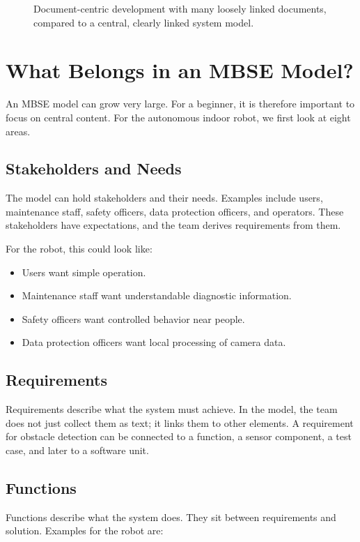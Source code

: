 \begin{figure}[H]
  \centering
  \caption{Document-centric development with many loosely linked documents, compared to a central, clearly linked system model.}
  \label{fig:kap02-dokumentenzentriert-vs-modellbasiert}
\end{figure}

\section{What Belongs in an MBSE Model?}
An MBSE model can grow very large. For a beginner, it is therefore important to focus on central content. For the autonomous indoor robot, we first look at eight areas.

\subsection{Stakeholders and Needs}
The model can hold stakeholders and their needs. Examples include users, maintenance staff, safety officers, data protection officers, and operators. These stakeholders have expectations, and the team derives requirements from them.

For the robot, this could look like:

\begin{itemize}
    \item Users want simple operation.
    \item Maintenance staff want understandable diagnostic information.
    \item Safety officers want controlled behavior near people.
    \item Data protection officers want local processing of camera data.
\end{itemize}

\subsection{Requirements}
Requirements describe what the system must achieve. In the model, the team does not just collect them as text; it links them to other elements. A requirement for obstacle detection can be connected to a function, a sensor component, a test case, and later to a software unit.

\subsection{Functions}
Functions describe what the system does. They sit between requirements and solution. Examples for the robot are:

